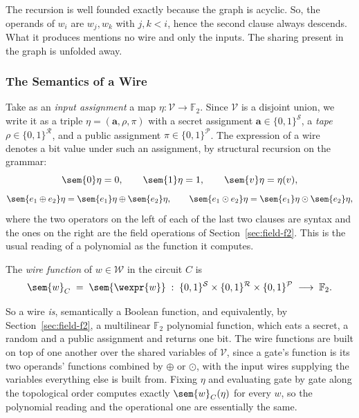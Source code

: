   The recursion is well founded exactly because the graph is acyclic. So, the
  operands of $w_i$ are $w_j, w_k$ with $j, k < i$, hence the second clause always
  descends. What it produces mentions no wire and only the inputs. The sharing
  present in the graph is unfolded away.

  \subsubsection{The Semantics of a Wire}

  Take as an \emph{input assignment} a map $\eta : \mathcal{V} \to \mathbb{F}_2$. Since
  $\mathcal{V}$ is a disjoint union, we write it as a triple
  $\eta = (\mathbf{a}, \rho, \pi)$ with a secret assignment
  $\mathbf{a} \in \{0,1\}^{\mathcal{S}}$, a \emph{tape}
  $\rho \in \{0,1\}^{\mathcal{R}}$, and a public assignment
  $\pi \in \{0,1\}^{\mathcal{P}}$. The expression of a wire denotes a bit value under
  such an assignment, by structural recursion on the grammar:
  \[
    \sem{0}\eta = 0, \qquad
    \sem{1}\eta = 1, \qquad
    \sem{v}\eta = \eta(v),
  \]
  \[
    \sem{e_1 \oplus e_2}\eta = \sem{e_1}\eta \oplus \sem{e_2}\eta, \qquad
    \sem{e_1 \odot e_2}\eta = \sem{e_1}\eta \odot \sem{e_2}\eta ,
  \]
  where the two operators on the left of each of the last two clauses are syntax
  and the ones on the right are the field operations of
  Section~\ref{sec:field-f2}. This is the usual reading of a polynomial as the
  function it computes.

  \begin{definition}
  \label{def:wire-function}
  The \emph{wire function} of $w \in \mathcal{W}$ in the circuit $C$ is
  \[
    \sem{w}_C \;=\; \sem{\wexpr{w}} \;:\;
      \{0,1\}^{\mathcal{S}} \times \{0,1\}^{\mathcal{R}} \times \{0,1\}^{\mathcal{P}}
      \;\longrightarrow\; \mathbb{F}_2 .
  \]
  \end{definition}

  So a wire \emph{is}, semantically a Boolean function, and equivalently,
  by Section~\ref{sec:field-f2}, a multilinear $\mathbb{F}_2$ polynomial function,
  which eats a secret, a random and a public assignment and returns one bit.
  The wire functions are built on top of one another over the shared variables of $\mathcal{V}$,
  since a gate's function is its two operands' functions combined by $\oplus$ or
  $\odot$, with the input wires supplying the variables everything else is built
  from. Fixing $\eta$ and evaluating gate by gate along the topological order
  computes exactly $\sem{w}_C(\eta)$ for every $w$, so the polynomial reading and
  the operational one are essentially the same.


